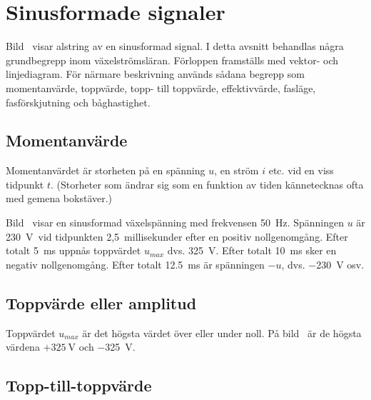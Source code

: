 \newpage
\section{Sinusformade signaler}


Bild~ visar alstring av en sinusformad signal.
I detta avsnitt behandlas några grundbegrepp inom växelströmsläran.
Förloppen framställs med vektor- och linjediagram.
För närmare beskrivning används sådana begrepp som momentanvärde,
toppvärde, topp- till toppvärde, effektivvärde, fasläge, fasförskjutning och
båghastighet.

\subsection{Momentanvärde}

Momentanvärdet är storheten på en spänning \(u\), en ström \(i\) etc. vid en
viss tidpunkt \(t\).
(Storheter som ändrar sig som en funktion av tiden kännetecknas ofta med gemena
bokstäver.)

Bild~ visar en sinusformad växelspänning med frekvensen
\qty{50}{\hertz}.
Spänningen \(u\) är \qty[retain-explicit-plus]{+230}{\volt}\ vid tidpunkten
2,5~millisekunder efter en positiv nollgenomgång.
Efter totalt \qty{5}{\milli\second} uppnås toppvärdet \(u_{max}\) dvs.
\qty[retain-explicit-plus]{+325}{\volt}.
Efter totalt \qty{10}{\milli\second} sker en negativ nollgenomgång.
Efter totalt \qty{12,5}{\milli\second} är spänningen \(-u\), dvs.
\qty{-230}{\volt} osv.

\subsection{Toppvärde eller amplitud}
\label{toppvärde}

Toppvärdet \(u_{max}\) är det högsta värdet över eller under noll.
På bild~ är de högsta värdena \(+325\ \text{V}\) och
\qty{-325}{\volt}.

\subsection{Topp-till-toppvärde}
\label{peak-to-peak-värde}

